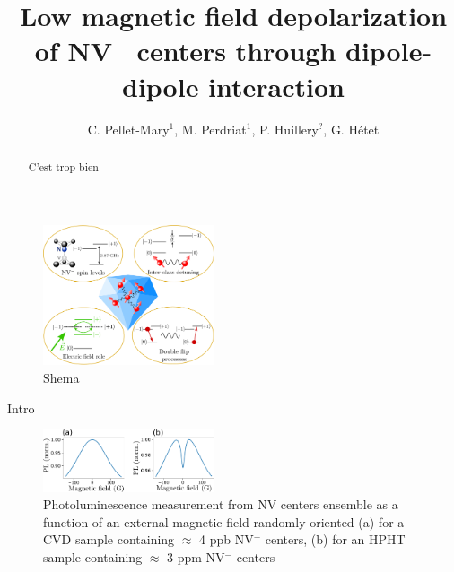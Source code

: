 \documentclass[preprintnumbers,amsmath,amssymb,superscriptaddress,twocolumn,showpacs]{revtex4-2}
\begin{document}
\title{Low magnetic field depolarization of NV$^-$ centers through dipole-dipole interaction}

\author{C. Pellet-Mary$^1$, M. Perdriat$^1$, P. Huillery$^?$,  G. H\'etet} 


\begin{abstract}
C'est trop bien
\end{abstract}

\maketitle

\begin{figure}
\includegraphics[width=0.45\textwidth]{Figures/shema_summary}
\caption{Shema}
\label{PL_NV_density}
\end{figure}

Intro

\begin{figure}
\includegraphics[width=0.45\textwidth]{Figures/fig dense vs pas dense}
\caption{Photoluminescence measurement from NV centers ensemble as a function of an external magnetic field randomly oriented (a) for a CVD sample containing $\approx$ 4 ppb NV$^-$ centers, (b) for an HPHT sample containing $\approx$ 3 ppm NV$^-$ centers}
\label{PL_NV_density}
\end{figure}
\end{document}
